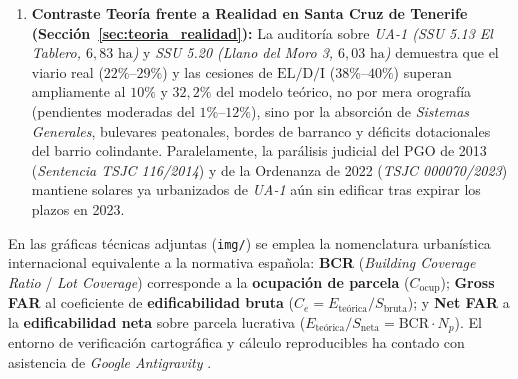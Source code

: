 \begin{enumerate}
  \item \textbf{Contraste Teoría frente a Realidad en Santa Cruz de Tenerife (Sección~\ref{sec:teoria_realidad}):} La auditoría sobre \emph{UA-1 (SSU 5.13 El Tablero, $6,83\text{ ha}$)} y \emph{SSU 5.20 (Llano del Moro 3, $6,03\text{ ha}$)} demuestra que el viario real ($22\%$--$29\%$) y las cesiones de $\text{EL/D/I}$ ($38\%$--$40\%$) superan ampliamente al $10\%$ y $32,2\%$ del modelo teórico, no por mera orografía (pendientes moderadas del $1\%$--$12\%$), sino por la absorción de \emph{Sistemas Generales}, bulevares peatonales, bordes de barranco y déficits dotacionales del barrio colindante. Paralelamente, la parálisis judicial del PGO de 2013 (\emph{Sentencia TSJC 116/2014}) y de la Ordenanza de 2022 (\emph{TSJC 000070/2023}) mantiene solares ya urbanizados de \emph{UA-1} aún sin edificar tras expirar los plazos en 2023.
\end{enumerate}

\begin{tcolorbox}[jumpbox, title={\textbf{Nota Terminológica Internacional}}]
En las gráficas técnicas adjuntas (\texttt{img/}) se emplea la nomenclatura urbanística internacional equivalente a la normativa española: \textbf{BCR} (\emph{Building Coverage Ratio} / \emph{Lot Coverage}) corresponde a la \textbf{ocupación de parcela} ($C_{\text{ocup}}$); \textbf{Gross FAR} al coeficiente de \textbf{edificabilidad bruta} ($C_e = E_{\text{teórica}}/S_{\text{bruta}}$); y \textbf{Net FAR} a la \textbf{edificabilidad neta} sobre parcela lucrativa ($E_{\text{teórica}}/S_{\text{neta}} = \text{BCR} \cdot N_p$). El entorno de verificación cartográfica y cálculo reproducibles ha contado con asistencia de \emph{Google Antigravity} \cite{google_antigravity_2026}.
\end{tcolorbox}
